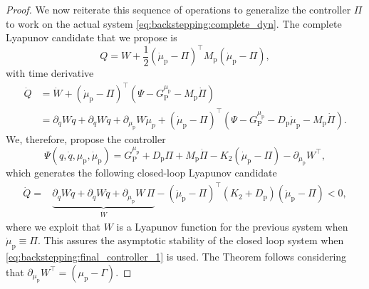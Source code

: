 \begin{proof}
	We now reiterate this sequence of operations to generalize the controller $\Pi$ to work on the actual system \eqref{eq:backstepping:complete_dyn}.
	The complete Lyapunov candidate that we propose is
	\begin{equation}
		Q = W + \frac{1}{2}(\dot{\mu}_\mathrm{p} - \Pi)^{\top} M_\mathrm{p} (\dot{\mu}_\mathrm{p} - \Pi),
	\end{equation}
	with time derivative
	\begin{equation*}
		\begin{split}
			\dot{Q} &= \dot{W} + (\dot{\mu}_\mathrm{p} - \Pi)^{\top} (\Psi - G_{\mathrm{P}}^{\mu_\mathrm{p}} - M_\mathrm{p} \dot{\Pi}) \\
			 &= \partial_{q} W \dot{q} + \partial_{\dot{q}} W \ddot{q} + \partial_{\mu_\mathrm{p}} W \dot{\mu}_p + (\dot{\mu}_\mathrm{p} - \Pi)^{\top} (\Psi - G_{\mathrm{P}}^{\mu_\mathrm{p}} - D_\mathrm{p} \dot{\mu}_\mathrm{p} - M_\mathrm{p} \dot{\Pi}) .
		\end{split}
	\end{equation*}
	We, therefore, propose the controller
	\begin{equation}\label{eq:backstepping:final_controller_1}
	    \Psi(q, \dot{q}, \mu_\mathrm{p}, \dot{\mu}_\mathrm{p}) = G_{\mathrm{P}}^{\mu_\mathrm{p}} + D_\mathrm{p} \Pi + M_\mathrm{p} \dot{\Pi} - K_2 (\dot{\mu}_\mathrm{p} - \Pi) 
	    - \partial_{\mu_\mathrm{p}} W^{\top}\!,
	\end{equation}
	which generates the following closed-loop Lyapunov candidate
	\begin{equation}
	    \begin{split}
			\dot{Q} =& \underbrace{\partial_{q} W \dot{q} + \partial_{\dot{q}} W \ddot{q} + \partial_{\mu_\mathrm{p}} W \, \Pi}_{\dot{W}} - (\dot{\mu}_\mathrm{p} - \Pi)^{\top} (K_2 + D_\mathrm{p}) (\dot{\mu}_\mathrm{p} - \Pi)
			< 0,
	    \end{split}
	\end{equation}
	where we exploit that $W$ is a Lyapunov function for the previous system when $\dot{\mu}_\mathrm{p} \equiv \Pi$. This assures the asymptotic stability of the closed loop system when \eqref{eq:backstepping:final_controller_1} is used. The Theorem follows considering that $\partial_{\mu_\mathrm{p}} W^{\top} = (\mu_\mathrm{p} - \Gamma)$.
	

\end{proof}
